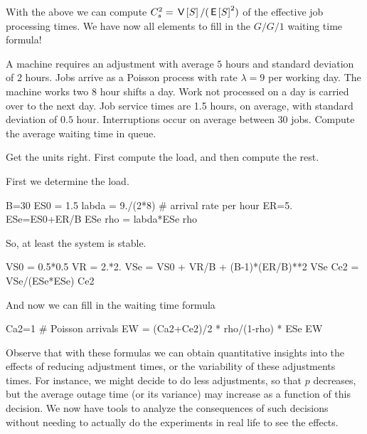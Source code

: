With the above we can compute $C_s^2=\,\mathsf{V}\left[S\right]/(\,\mathsf{E}\left[S\right]^2)$ of the effective job processing times. We have now all elements to fill in the $G/G/1$ waiting time formula!

\begin{exercise}[\faPhoto]
  A machine requires an adjustment with average $5$ hours and standard deviation of $2$ hours.
  Jobs arrive as a Poisson process with rate $\lambda=9$ per working day.
  The machine works two $8$ hour shifts a day.
  Work not processed on a day is carried over to the next day.
  Job service times are 1.5 hours, on average, with standard deviation of $0.5$ hour.
  Interruptions occur on average between $30$ jobs.
  Compute the average waiting time in queue.
\begin{hint}
  Get the units right. First compute the load, and then compute the rest.
\end{hint}
\begin{solution}
  First we determine the load. 
  \begin{pyconsole}
B=30
ES0 = 1.5
labda = 9./(2*8) # arrival rate per hour
ER=5.
ESe=ES0+ER/B
ESe
rho = labda*ESe
rho
  \end{pyconsole}
So, at least the system is stable.

\begin{pyconsole}
VS0 = 0.5*0.5
VR = 2.*2.
VSe = VS0 + VR/B + (B-1)*(ER/B)**2
VSe
Ce2 = VSe/(ESe*ESe)
Ce2
\end{pyconsole}

And now we can fill in the waiting time formula
\begin{pyconsole}
Ca2=1 # Poisson arrivals
EW = (Ca2+Ce2)/2 * rho/(1-rho) * ESe
EW  
\end{pyconsole}
\end{solution}
\end{exercise}

Observe that with these formulas we can obtain quantitative insights into the effects of reducing adjustment times, or the variability of these adjustments times.
For instance, we might decide to do less adjustments, so that $p$ decreases, but the average outage time (or its variance) may increase as a function of this decision.
We now have tools to analyze the consequences of such decisions without needing to actually do the experiments in real life to see the effects.






